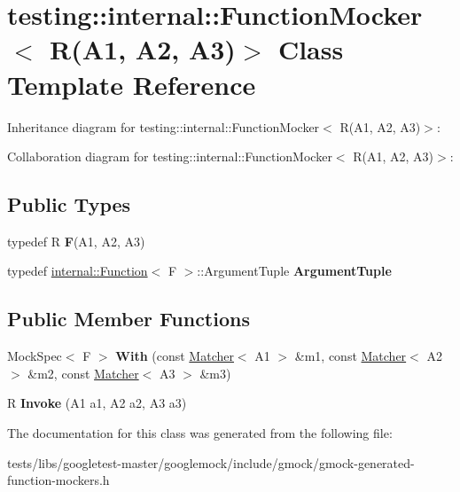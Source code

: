 \hypertarget{classtesting_1_1internal_1_1FunctionMocker_3_01R_07A1_00_01A2_00_01A3_08_4}{}\section{testing\+:\+:internal\+:\+:Function\+Mocker$<$ R(A1, A2, A3)$>$ Class Template Reference}
\label{classtesting_1_1internal_1_1FunctionMocker_3_01R_07A1_00_01A2_00_01A3_08_4}


Inheritance diagram for testing\+:\+:internal\+:\+:Function\+Mocker$<$ R(A1, A2, A3)$>$\+:


Collaboration diagram for testing\+:\+:internal\+:\+:Function\+Mocker$<$ R(A1, A2, A3)$>$\+:
\subsection*{Public Types}
\begin{DoxyCompactItemize}
\item 
\mbox{\label{classtesting_1_1internal_1_1FunctionMocker_3_01R_07A1_00_01A2_00_01A3_08_4_a8c471830f963b8012785eb3eeca2cc9c}} 
typedef R {\bfseries F}(A1, A2, A3)
\item 
\mbox{\label{classtesting_1_1internal_1_1FunctionMocker_3_01R_07A1_00_01A2_00_01A3_08_4_a347dcf4c054a5f1fbd0e2f0ad1c5e2f3}} 
typedef \hyperlink{structtesting_1_1internal_1_1Function}{internal\+::\+Function}$<$ F $>$\+::Argument\+Tuple {\bfseries Argument\+Tuple}
\end{DoxyCompactItemize}
\subsection*{Public Member Functions}
\begin{DoxyCompactItemize}
\item 
\mbox{\label{classtesting_1_1internal_1_1FunctionMocker_3_01R_07A1_00_01A2_00_01A3_08_4_a06fc66e2e75ff98d257966e7234bb833}} 
Mock\+Spec$<$ F $>$ {\bfseries With} (const \hyperlink{classtesting_1_1Matcher}{Matcher}$<$ A1 $>$ \&m1, const \hyperlink{classtesting_1_1Matcher}{Matcher}$<$ A2 $>$ \&m2, const \hyperlink{classtesting_1_1Matcher}{Matcher}$<$ A3 $>$ \&m3)
\item 
\mbox{\label{classtesting_1_1internal_1_1FunctionMocker_3_01R_07A1_00_01A2_00_01A3_08_4_a2afad9e39ca64acc6b178fa415907c5b}} 
R {\bfseries Invoke} (A1 a1, A2 a2, A3 a3)
\end{DoxyCompactItemize}


The documentation for this class was generated from the following file\+:\begin{DoxyCompactItemize}
\item 
tests/libs/googletest-\/master/googlemock/include/gmock/gmock-\/generated-\/function-\/mockers.\+h\end{DoxyCompactItemize}
